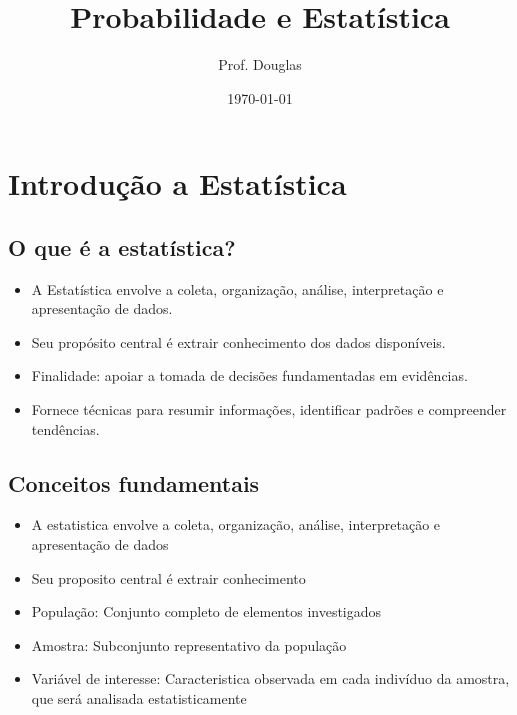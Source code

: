 \documentclass[12pt]{article}
\title{Probabilidade e Estatística}
\author{Prof. Douglas}
\date{\today}
\begin{document}
\maketitle

\section{Introdução a Estatística}
    \subsection{O que é a estatística?}
    \begin{itemize}
        \item A Estatística envolve a coleta, organização, análise, interpretação 
        e apresentação de dados.
        \item Seu propósito central é extrair conhecimento dos dados disponíveis.
        \item Finalidade: apoiar a tomada de decisões fundamentadas em evidências.
        \item Fornece técnicas para resumir informações, identificar padrões e 
        compreender tendências.
    \end{itemize}
    \subsection{Conceitos fundamentais}
    \begin{itemize}
        \item A estatistica envolve a coleta, organização, análise, interpretação 
        e apresentação de dados
        \item Seu proposito central é extrair conhecimento 
        \item População: Conjunto completo de elementos investigados
        \item Amostra: Subconjunto representativo da população
        \item Variável de interesse: Caracteristica observada em cada indivíduo 
        da amostra, que será analisada estatisticamente
    \end{itemize}
\end{document}
